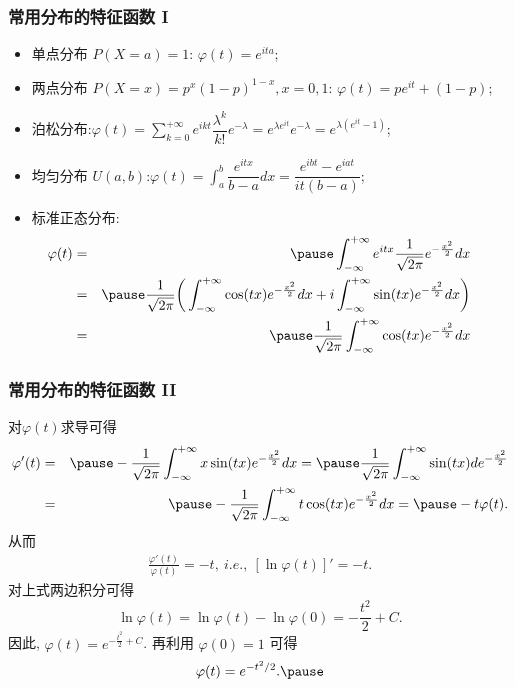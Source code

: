 \begin{frame}%
	\frametitle{常用分布的特征函数  I}
	\begin{itemize}[<+-|alert@+>]
		\item 单点分布 $P (X=a)=1$: $\varphi (t)=e^{ita}$;
		\item 两点分布  $P (X=x)=p^x (1-p)^{1-x}, x=0,1$: $\varphi (t)=pe^{it}+(1-p)$;
		\item 泊松分布:$\varphi (t)=\sum_{k=0}^{+\infty} e^{ikt}\dfrac{\lambda^k}{k!} e^{-\lambda}=e^{\lambda e^{it}} e^{-\lambda}=e^{\lambda (e^{it}-1)}$;
		\item 均匀分布 $U (a,b)$:$\varphi (t)=\int_a^b\dfrac{e^{itx}}{b-a} dx=\dfrac{e^{ibt}-e^{iat}}{it (b-a)}$;
		\item 标准正态分布:
		\begin{eqnarray*}
			\hspace{-1cm}\varphi(t)&=&\pause \int_{-\infty}^{+\infty}e^{itx}\dfrac{1}{\sqrt{2\pi}}e^{-\frac{x^2}{2}}dx\\
			&=&\pause \dfrac{1}{\sqrt{2\pi}}\bigg(\int_{-\infty}^{+\infty}\cos(tx) e^{-\frac{x^2}{2}}dx+i\int_{-\infty}^{+\infty}\sin(tx) e^{-\frac{x^2}{2}}dx\bigg)\\
			\hspace{-1cm}&=&\pause \dfrac{1}{\sqrt{2\pi}}\int_{-\infty}^{+\infty}\cos(tx) e^{-\frac{x^2}{2}}dx
		\end{eqnarray*}\pause
	\end{itemize}
\end{frame}
\begin{frame}%
	\frametitle{常用分布的特征函数  II}
对$\varphi(t)$求导可得
{\small \begin{eqnarray*}
		\varphi'(t)&=&\pause -\dfrac{1}{\sqrt{2\pi}}\int_{-\infty}^{+\infty}x\sin(tx) e^{-\frac{x^2}{2}}dx=\pause \dfrac{1}{\sqrt{2\pi}}\int_{-\infty}^{+\infty}\sin(tx) de^{-\frac{x^2}{2}}\\
		&=&\pause -\dfrac{1}{\sqrt{2\pi}}\int_{-\infty}^{+\infty}t\cos(tx) e^{-\frac{x^2}{2}}dx=\pause -t\varphi(t).
	\end{eqnarray*}}
	\pause 从而
	\begin{align*}
		\frac{\varphi'(t)}{\varphi(t)}=-t,\  i.e.,\  [\ln \varphi(t)]'=-t.
	\end{align*}
	对上式两边积分可得
	\[\ln \varphi(t)=\ln \varphi(t)-\ln \varphi(0) = -\frac{t^2}{2}+C.\]
	因此, $\varphi(t)=e^{-\frac{t^2}{2}+C}$.
	\pause %
	再利用 $\varphi (0)=1$ 可得
	\begin{eqnarray*}
		\varphi(t)=e^{-t^2/2}.\pause
	\end{eqnarray*}
\end{frame}
